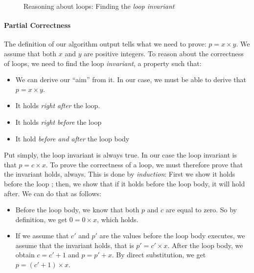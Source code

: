 \documentclass{aldast}
\begin{document}
\begin{figure}[htbp]
  \begin{center}
    
  \end{center}
  \caption{Reasoning about loops: Finding the \emph{loop invariant}}
  \label{fig:product}
\end{figure}

\paragraph{Partial Correctness} The definition of our algorithm output
tells what we need to prove: $p = x \times y$. We assume that both $x$
and $y$ are positive integers. To reason about the correctness of
loops, we need to find the loop \emph{invariant}, a property such
that:
\begin{itemize}
\item We can derive our ``aim'' from it. In our case, we must be able
  to derive that $p = x \times y$.
\item It holds \emph{right after} the loop.
\item It holds \emph{right before} the loop
\item It hold \emph{before and after} the loop body
\end{itemize}

Put simply, the loop invariant is always true. In our case the loop invariant is that
$p = c \times x$. To prove the correctness of a loop, we must
therefore prove that the invariant holds, always. This is done by
\emph{induction}:
First we show it holds before the loop ; then, we show that if it
holds before the loop body, it will hold after. We can do that as
follows:

\begin{itemize}
\item Before the loop body, we know that both $p$ and $c$ are equal to
  zero. So by definition, we get $0 = 0 \times x$, which holds.
\item If we assume that $c'$ and $p'$ are the values before the loop
  body executes, we assume that the invariant holds, that is
  $p' = c' \times x$. After the loop body, we obtain $c = c'+1$ and
  $p=p'+x$. By direct substitution, we get $p = (c'+1) \times x$.
\end{itemize}
\end{document}
